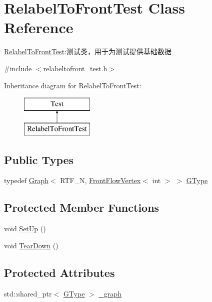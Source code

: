 \hypertarget{class_relabel_to_front_test}{}\section{Relabel\+To\+Front\+Test Class Reference}
\label{class_relabel_to_front_test}


\hyperlink{class_relabel_to_front_test}{Relabel\+To\+Front\+Test}\+:测试类，用于为测试提供基础数据  




{\ttfamily \#include $<$relabeltofront\+\_\+test.\+h$>$}

Inheritance diagram for Relabel\+To\+Front\+Test\+:\begin{figure}[H]
\begin{center}
\leavevmode
\includegraphics[height=2.000000cm]{class_relabel_to_front_test}
\end{center}
\end{figure}
\subsection*{Public Types}
\begin{DoxyCompactItemize}
\item 
typedef \hyperlink{struct_introduction_to_algorithm_1_1_graph_algorithm_1_1_graph}{Graph}$<$ R\+T\+F\+\_\+\+N, \hyperlink{struct_introduction_to_algorithm_1_1_graph_algorithm_1_1_front_flow_vertex}{Front\+Flow\+Vertex}$<$ int $>$ $>$ \hyperlink{class_relabel_to_front_test_a50ca1a0a59136fe999254bdfb2b21a7b}{G\+Type}
\end{DoxyCompactItemize}
\subsection*{Protected Member Functions}
\begin{DoxyCompactItemize}
\item 
void \hyperlink{class_relabel_to_front_test_a52350917cedfacccb9fe544ce86e13e0}{Set\+Up} ()
\item 
void \hyperlink{class_relabel_to_front_test_a8ee298a2969fd037af9b263d127c1a06}{Tear\+Down} ()
\end{DoxyCompactItemize}
\subsection*{Protected Attributes}
\begin{DoxyCompactItemize}
\item 
std\+::shared\+\_\+ptr$<$ \hyperlink{class_relabel_to_front_test_a50ca1a0a59136fe999254bdfb2b21a7b}{G\+Type} $>$ \hyperlink{class_relabel_to_front_test_a3eecd133a6421543cc88cff1b7ffa6f2}{\+\_\+graph}
\end{DoxyCompactItemize}


